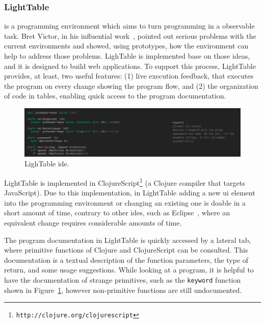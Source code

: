 \subsubsection{LightTable} is a programming environment which aims to turn programming in a observable task. Bret Victor, in his influential work~\cite{inventingPrin,learnableProg}, pointed out serious problems with the current environments and showed, using prototypes, how the environment can help to address those problems. LighTable is implemented base on those ideas, and it is designed to build web applications. To support this process, LightTable provides, at least, two useful features: (1) live execution feedback, that executes the program on every change showing the program flow, and (2) the organization of code in tables, enabling quick access to the program documentation.

\begin{figure}[!htbp]
\vspace{-10pt}
  \centering
  \includegraphics[width=1.0\textwidth]{img/lt2}
    \vspace{-20pt}
    \caption{LighTable \ac{ide}.}
    \vspace{-10pt}  
  \label{fig:lt}
\end{figure} 

LightTable is implemented in ClojureScript\footnote{\texttt{http://clojure.org/clojurescript}} (a Clojure compiler that targets JavaScript). Due to this implementation, in LightTable adding a new \ac{ui} element into the programming environment or changing an existing one is doable in a short amount of time, contrary to other \ac{ide}s, such as Eclipse~\cite{carlson2005eclipse}, where an equivalent change requires considerable amounts of time. 

The program documentation in LightTable is quickly accessed by a lateral tab, where primitive functions of Clojure and ClojureScript can be consulted. This documentation is a textual description of the function parameters, the type of return, and some usage suggestions. While looking at a program, it is helpful to have the documentation of strange primitives, such as the \texttt{keyword} function shown in Figure~\ref{fig:lt}, however non-primitive functions are still undocumented. 

